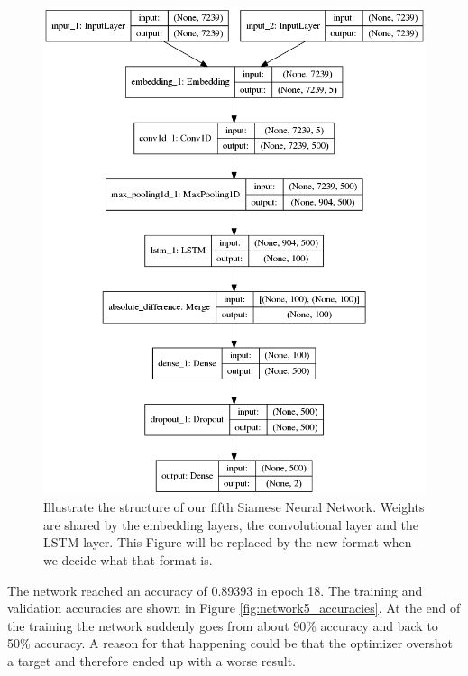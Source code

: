 \begin{figure}
    \centering
    \includegraphics[width=\textwidth]{./pictures/experiments/network5.png}
    \caption{Illustrate the structure of our fifth Siamese Neural Network.
        Weights are shared by the embedding layers, the convolutional layer and
        the LSTM layer. This Figure will be replaced by the new format when we
        decide what that format is.}
    \label{fig:network5}
\end{figure}

The network reached an accuracy of 0.89393 in epoch 18. The training and
validation accuracies are shown in Figure \ref{fig:network5_accuracies}. At the
end of the training the network suddenly goes from about 90\% accuracy and back
to 50\% accuracy. A reason for that happening could be that the optimizer
overshot a target and therefore ended up with a worse result.

